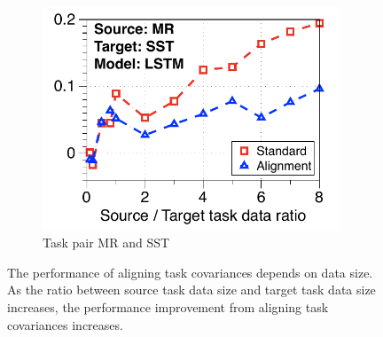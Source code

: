 \begin{figure}[!ht]
\begin{subfigure}[b]{0.33\textwidth}
		\includegraphics[width=0.975\textwidth]{figures/ratio_alignment_mr_sst_lstm.pdf}
		\caption{Task pair MR and SST}
	\end{subfigure}
	\caption{The performance of aligning task covariances depends on data size. As the ratio between source task data size and target task data size increases, the performance improvement from aligning task covariances increases.}
	\label{fig_covariate}
\end{figure}











